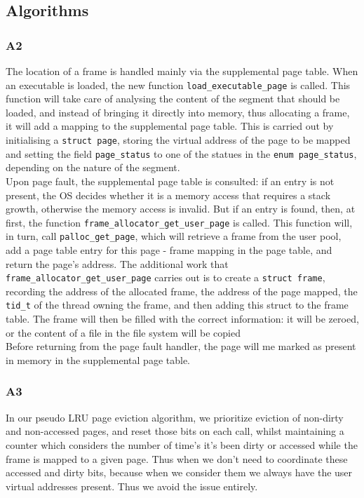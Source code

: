 \documentclass[a4wide, 11pt]{article}
\newcommand{\tx}{\texttt}
\begin{document}
\subsection{Algorithms}
\subsubsection{A2}
The location of a frame is handled mainly via the supplemental page table.
When an executable is loaded, the new function \tx{load\_executable\_page} is called. This function will take care of analysing the content of the segment that should be loaded, and instead of bringing it directly into memory, thus allocating a frame, it will add a mapping to the supplemental page table. This is carried out by initialising a \tx{struct page}, storing the virtual address of the page to be mapped and   setting the field \tx{page\_status} to one of the statues in the \tx{enum page\_status}, depending on the nature of the segment. \\
Upon page fault, the supplemental page table is consulted: if an entry is not present, the OS decides whether it is a memory access that requires a stack growth, otherwise the memory access is invalid. But if an entry is found, then, at first, the function \tx{frame\_allocator\_get\_user\_page} is called. This function will, in turn, call \tx{palloc\_get\_page}, which will retrieve a frame from the user pool, add a page table entry for this page - frame mapping in the page table, and return the page's address. The additional work that \tx{frame\_allocator\_get\_user\_page} carries out is to create a \tx{struct frame}, recording the address of the allocated frame, the address of the page  mapped, the \tx{tid\_t} of the thread owning the frame, and then adding this struct to the frame table. The frame will then be filled with the correct information: it will be zeroed, or the content of a file in the file system will be copied \\
Before returning from the page fault handler, the page will me marked as present in memory in the supplemental page table.
\subsubsection{A3}

In our pseudo LRU page eviction algorithm, we prioritize eviction of non-dirty and non-accessed pages, and reset those bits on each call, whilst maintaining a counter which considers the number of time's it's been dirty or accessed while the frame is mapped to a given page. Thus when we don't need to coordinate these accessed and dirty bits, because when we consider them we always have the user virtual addresses present. Thus we avoid the issue entirely.
\end{document}
